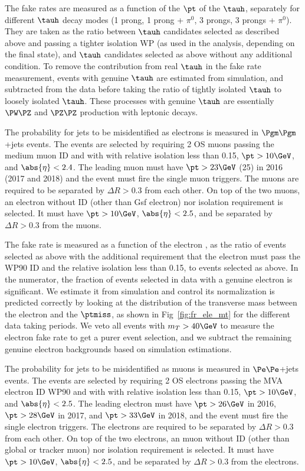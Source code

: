 The fake rates are measured as a function of the $\pt$ of the $\tauh$, separately for different $\tauh$ decay modes 
(1 prong, 1 prong + $\pi^0$, 3 prongs, 3 prongs + $\pi^0$). They are taken as the ratio between $\tauh$ candidates selected as described above and passing a tighter isolation WP (as used in the analysis, depending on the final state), 
and $\tauh$ candidates selected as above without any additional condition. To remove the contribution from real $\tauh$ 
in the fake rate measurement, events with genuine $\tauh$  are estimated from simulation, and subtracted from the 
data before taking the ratio of tightly isolated $\tauh$ to loosely isolated $\tauh$. These processes with genuine $\tauh$ 
are essentially $\PW\PZ$ and $\PZ\PZ$ production with leptonic decays. 


The probability for jets to be misidentified as electrons is measured in $\Pgm\Pgm$+jets events. The events are selected by requiring 2 OS muons passing the medium muon ID and with with relative isolation less than
0.15, $\pt>10\GeV$, and $\abs{\eta}<2.4$. The leading muon must have $\pt>23\GeV$ (25\GeV) in 2016 (2017 and 2018) and
the event must fire the single muon triggers. The muons are required to be separated
by $\Delta R>0.3$ from each other. On top of the two muons, an electron without ID (other than Gsf electron) nor 
isolation requirement is selected. It must have $\pt>10\GeV$, $\abs{\eta}<2.5$, and be separated by $\Delta R>0.3$ 
from the muons. 

The fake rate is measured as a function of the electron \pt, as the ratio of events selected as above with the additional 
requirement that the electron must pass the WP90 ID and the relative isolation less than 0.15, to events selected as 
above. In the numerator, the fraction of events selected in data with a genuine electron is significant. We estimate 
it from simulation and control its normalization is predicted correctly by looking at the distribution of the 
transverse mass between the electron and the $\ptmiss$, as shown in Fig~\ref{fig:fr_ele_mt} for the different 
data taking periods.
We veto all events with $m_T>40\GeV$ to measure the electron fake rate to get a purer 
event selection, and we subtract the remaining genuine electron backgrounds based on simulation estimations. 


The probability for jets to be misidentified as muons is measured in $\Pe\Pe$+jets events. The events are selected by requiring 2 OS electrons passing the MVA electron ID WP90 and with with relative isolation less than
0.15, $\pt>10\GeV$, and $\abs{\eta}<2.5$. The leading electron must have $\pt>26\GeV$ in 2016, $\pt>28\GeV$ in 2017, 
and $\pt>33\GeV$ in 2018, and
the event must fire the single electron triggers. The electrons are required to be separated
by $\Delta R>0.3$ from each other. On top of the two electrons, an muon without ID (other than global or tracker muon) nor
isolation requirement is selected. It must have $\pt>10\GeV$, $\abs{\eta}<2.5$, and be separated by $\Delta R>0.3$
from the electrons.

